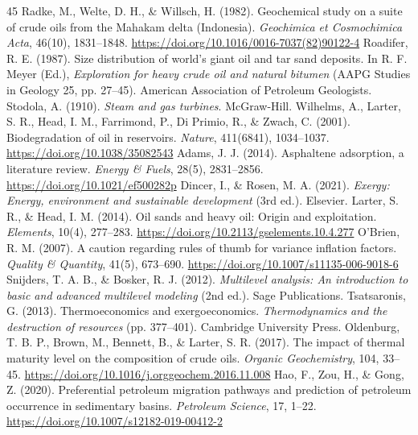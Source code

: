\documentclass[review,12pt]{elsarticle}
\begin{document}
\begin{thebibliography}{45}
 Radke, M., Welte, D. H., \& Willsch, H. (1982). Geochemical study on a suite of crude oils from the Mahakam delta (Indonesia). \textit{Geochimica et Cosmochimica Acta}, 46(10), 1831--1848. \url{https://doi.org/10.1016/0016-7037(82)90122-4}
 Roadifer, R. E. (1987). Size distribution of world's giant oil and tar sand deposits. In R. F. Meyer (Ed.), \textit{Exploration for heavy crude oil and natural bitumen} (AAPG Studies in Geology 25, pp. 27--45). American Association of Petroleum Geologists.
 Stodola, A. (1910). \textit{Steam and gas turbines}. McGraw-Hill.
 Wilhelms, A., Larter, S. R., Head, I. M., Farrimond, P., Di Primio, R., \& Zwach, C. (2001). Biodegradation of oil in reservoirs. \textit{Nature}, 411(6841), 1034--1037. \url{https://doi.org/10.1038/35082543}
 Adams, J. J. (2014). Asphaltene adsorption, a literature review. \textit{Energy \& Fuels}, 28(5), 2831--2856. \url{https://doi.org/10.1021/ef500282p}
 Dincer, I., \& Rosen, M. A. (2021). \textit{Exergy: Energy, environment and sustainable development} (3rd ed.). Elsevier.
 Larter, S. R., \& Head, I. M. (2014). Oil sands and heavy oil: Origin and exploitation. \textit{Elements}, 10(4), 277--283. \url{https://doi.org/10.2113/gselements.10.4.277}
 O'Brien, R. M. (2007). A caution regarding rules of thumb for variance inflation factors. \textit{Quality \& Quantity}, 41(5), 673--690. \url{https://doi.org/10.1007/s11135-006-9018-6}
 Snijders, T. A. B., \& Bosker, R. J. (2012). \textit{Multilevel analysis: An introduction to basic and advanced multilevel modeling} (2nd ed.). Sage Publications.
 Tsatsaronis, G. (2013). Thermoeconomics and exergoeconomics. \textit{Thermodynamics and the destruction of resources} (pp. 377--401). Cambridge University Press.
 Oldenburg, T. B. P., Brown, M., Bennett, B., \& Larter, S. R. (2017). The impact of thermal maturity level on the composition of crude oils. \textit{Organic Geochemistry}, 104, 33--45. \url{https://doi.org/10.1016/j.orggeochem.2016.11.008}
 Hao, F., Zou, H., \& Gong, Z. (2020). Preferential petroleum migration pathways and prediction of petroleum occurrence in sedimentary basins. \textit{Petroleum Science}, 17, 1--22. \url{https://doi.org/10.1007/s12182-019-00412-2}

\end{thebibliography}
\end{document}
